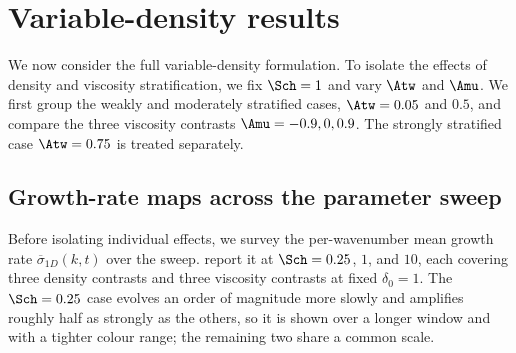 \section{Variable-density results}
\label{sec:variable_density}

We now consider the full variable-density formulation. To isolate the effects of density and
viscosity stratification, we fix \(\Sch=1\) and vary \(\Atw\) and \(\Amu\). We first group the
weakly and moderately stratified cases, \(\Atw=0.05\) and \(0.5\), and compare the three viscosity
contrasts \(\Amu=-0.9,0,0.9\). The strongly stratified case \(\Atw=0.75\) is treated separately.

\subsection{Growth-rate maps across the parameter sweep}
\label{sec:vd_sigma_maps}

Before isolating individual effects, we survey the per-wavenumber mean growth rate
\(\overline{\sigma}_{1D}(k,t)\) over the sweep. 
report it at \(\Sch=0.25\), \(1\), and \(10\), each covering three density contrasts and three
viscosity contrasts at fixed \(\delta_0=1\). The \(\Sch=0.25\) case evolves an order of magnitude
more slowly and amplifies roughly half as strongly as the others, so it is shown over a longer
window and with a tighter colour range; the remaining two share a common scale.

